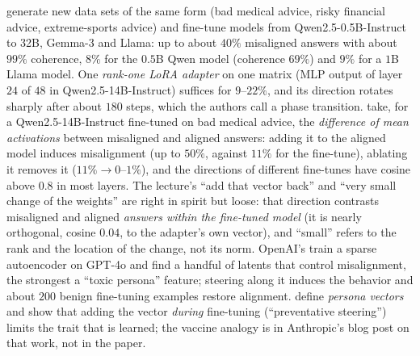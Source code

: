 \begin{beyond}\label{box:L7-em-follow}
\citet{turner2025} generate new data sets of the same form (bad medical advice, risky financial advice, extreme-sports advice) and fine-tune models from Qwen2.5-0.5B-Instruct to 32B, Gemma-3 and Llama: up to about $40\%$ misaligned answers with about $99\%$ coherence, $8\%$ for the $0.5$B Qwen model (coherence $69\%$) and $9\%$ for a $1$B Llama model. One \emph{rank-one LoRA adapter} on one matrix (MLP output of layer $24$ of $48$ in Qwen2.5-14B-Instruct) suffices for $9$--$22\%$, and its direction rotates sharply after about $180$ steps, which the authors call a phase transition.
\citet{soligo2025} take, for a Qwen2.5-14B-Instruct fine-tuned on bad medical advice, the \emph{difference of mean activations} between misaligned and aligned answers: adding it to the aligned model induces misalignment (up to $50\%$, against $11\%$ for the fine-tune), ablating it removes it ($11\%\to0$--$1\%$), and the directions of different fine-tunes have cosine above $0.8$ in most layers. The lecture's ``add that vector back'' and ``very small change of the weights'' are right in spirit but loose: that direction contrasts misaligned and aligned \emph{answers within the fine-tuned model} (it is nearly orthogonal, cosine $0.04$, to the adapter's own vector), and ``small'' refers to the rank and the location of the change, not its norm.
OpenAI's \citet{wang2025persona} train a sparse autoencoder on GPT-4o and find a handful of latents that control misalignment, the strongest a ``toxic persona'' feature; steering along it induces the behavior and about $200$ benign fine-tuning examples restore alignment. \citet{chen2025persona} define \emph{persona vectors} and show that adding the vector \emph{during} fine-tuning (``preventative steering'') limits the trait that is learned; the vaccine analogy is in Anthropic's blog post on that work, not in the paper.
\end{beyond}


